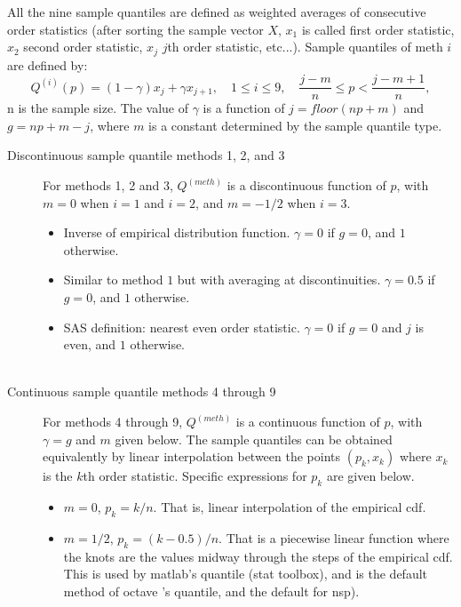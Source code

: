 \begin{mandescription}
All the nine sample quantiles are defined as weighted averages of consecutive order statistics
(after sorting the sample vector $X$, $x_1$ is called first order statistic, $x_2$ second order
statistic, $x_j$ $j$th  order statistic, etc...). Sample quantiles of meth $i$ are defined by:
$$
Q^{(i)}(p) = (1 - \gamma) x_j + \gamma x_{j+1}, \quad 1 \le i \le 9, \quad \frac{j-m}{n} \le p < \frac{j-m+1}{n},
$$
n is the sample size. The value of $\gamma$ is a function of $j = floor(np + m)$ and $g = np + m - j$, 
where $m$ is a constant determined by the sample quantile type. 

\begin{description}

\item[Discontinuous sample quantile methods 1, 2, and 3]

For methods 1, 2 and 3, $Q^{(meth)}$ is a discontinuous function of $p$, with $m = 0$ when $i = 1$ 
and $i = 2$, and $m = -1/2$ when $i = 3$.
\begin{itemize}
\item {} Inverse of empirical distribution function. $\gamma = 0$ if $g = 0$, and $1$ otherwise.

\item {} Similar to method $1$ but with averaging at discontinuities. $\gamma = 0.5$ if $g = 0$, and $1$ otherwise.

\item {} SAS definition: nearest even order statistic. $\gamma = 0$ if $g = 0$ and $j$ is even, and $1$ otherwise.
\end{itemize}

\item[~]

\item[Continuous sample quantile methods 4 through 9]

For methods 4 through 9, $Q^{(meth)}$ is a continuous function of $p$, with $\gamma = g$ and $m$ given below. 
The sample quantiles can be obtained equivalently by linear interpolation between the points 
$(p_k,x_k)$ where $x_k$ is the $k$th order statistic. Specific expressions for $p_k$ are given below. 

\begin{itemize}
\item {} $m=0$, $p_k = k / n$. That is, linear interpolation of the
          empirical cdf.

\item {} $m=1/2$, $p_k = (k - 0.5) / n$. That is a piecewise linear
          function where the knots are the values midway through the
          steps of the empirical cdf. This is used by matlab's quantile (stat toolbox), and is the default method of octave 's
          quantile, and the default for nsp).


\end{itemize}
\end{description}
\end{mandescription}
